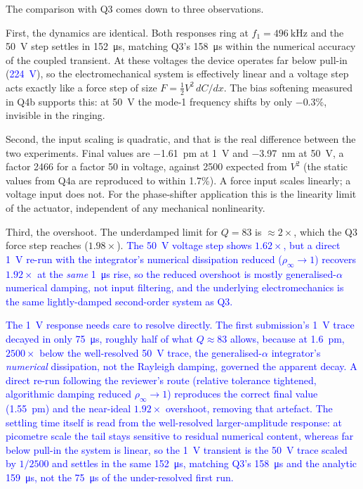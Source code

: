 The comparison with Q3 comes down to three observations.

First, the dynamics are identical. Both responses ring at
$f_{1}=\SI{496}{\kilo\hertz}$ and the \SI{50}{\volt} step settles in
\SI{152}{\micro\second}, matching Q3's \SI{158}{\micro\second} within the
numerical accuracy of the coupled transient. At these voltages the device
operates far below pull-in (\textcolor{blue}{\SI{224}{\volt}}), so the
electromechanical system is effectively linear and a voltage step acts exactly
like a force step of size $F=\tfrac{1}{2}V^{2}\,dC/dx$. The bias softening
measured in Q4b supports this: at \SI{50}{\volt} the mode-1 frequency shifts by
only $-0.3$\%, invisible in the ringing.

Second, the input scaling is quadratic, and that is the real difference
between the two experiments. Final values are \SI{-1.61}{\pico\meter} at
\SI{1}{\volt} and \SI{-3.97}{\nano\meter} at \SI{50}{\volt}, a factor 2466
for a factor 50 in voltage, against 2500 expected from $V^{2}$ (the static
values from Q4a are reproduced to within 1.7\%). A force input scales
linearly; a voltage input does not. For the phase-shifter application this
is the linearity limit of the actuator, independent of any mechanical
nonlinearity.

Third, the overshoot. The underdamped limit for $Q=83$ is $\approx2\times$,
which the Q3 force step reaches ($1.98\times$). \textcolor{blue}{The
\SI{50}{\volt} voltage step shows $1.62\times$, but a direct \SI{1}{\volt}
re-run with the integrator's numerical dissipation reduced
($\rho_\infty\!\to\!1$) recovers $1.92\times$ at the \emph{same}
\SI{1}{\micro\second} rise, so the reduced overshoot is mostly
generalised-$\alpha$ numerical damping, not input filtering, and the underlying
electromechanics is the same lightly-damped second-order system as Q3.}

\textcolor{blue}{The \SI{1}{\volt} response needs care to resolve directly. The
first submission's \SI{1}{\volt} trace decayed in only \SI{75}{\micro\second}, roughly half of what $Q\approx83$ allows, because at \SI{1.6}{\pico\meter},
$2500\times$ below the well-resolved \SI{50}{\volt} trace, the
generalised-$\alpha$ integrator's \emph{numerical} dissipation, not the Rayleigh
damping, governed the apparent decay. A direct re-run following the reviewer's
route (relative tolerance tightened, algorithmic damping reduced
$\rho_\infty\!\to\!1$) reproduces the correct final value (\SI{1.55}{\pico\meter})
and the near-ideal $1.92\times$ overshoot, removing that artefact. The settling
time itself is read from the well-resolved larger-amplitude response: at
picometre scale the tail stays sensitive to residual numerical content, whereas
far below pull-in the system is linear, so the \SI{1}{\volt} transient is the
\SI{50}{\volt} trace scaled by $1/2500$ and settles in the same
\SI{152}{\micro\second}, matching Q3's \SI{158}{\micro\second} and the
analytic \SI{159}{\micro\second}, not the \SI{75}{\micro\second} of the
under-resolved first run.}
